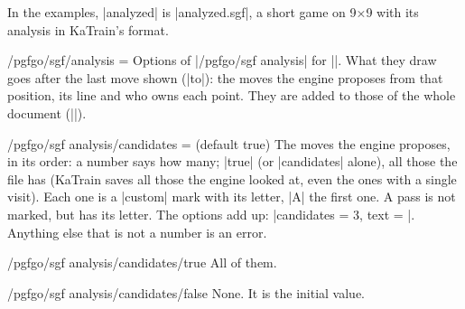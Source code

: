 In the examples, |analyzed| is |analyzed.sgf|, a short game on 9×9 with its analysis in KaTrain's format.

\begin{key}{/pgfgo/sgf/analysis = }
	Options of |/pgfgo/sgf analysis| for |\sgf|. What they draw goes after the last move shown (|to|): the moves the engine proposes from that position, its line and who owns each point. They are added to those of the whole document (||).

	\begin{codeexample}[]
		\begin{goban}[9, scale = 0.6]
		\end{goban}
		\pgfgocandidates
	\end{codeexample}
\end{key}

\begin{key}{/pgfgo/sgf analysis/candidates =  (default true)}
	The moves the engine proposes, in its order: a number says how many; |true| (or |candidates| alone), all those the file has (KaTrain saves all those the engine looked at, even the ones with a single visit). Each one is a |custom| mark with its letter, |A| the first one. A pass is not marked, but has its letter. The options add up: |candidates = {3, text = \pgfgowinrate}|. Anything else that is not a number is an error.
\end{key}

\begin{stylekey}{/pgfgo/sgf analysis/candidates/true}
	All of them.
\end{stylekey}

\begin{stylekey}{/pgfgo/sgf analysis/candidates/false}
	None. It is the initial value.
\end{stylekey}


